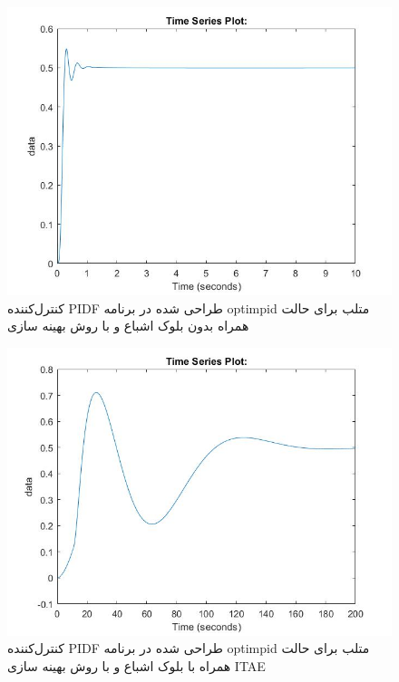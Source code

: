 \begin{figure}[H]
	\centering
	\includegraphics[width=12cm]{../Figure/P_IV/PID_IT2SE_without_sat.jpg}
	\caption{کنترل‌کننده PIDF طراحی شده در برنامه optimpid متلب برای حالت همراه بدون بلوک اشباع و با روش بهینه سازی }
\end{figure}



\begin{figure}[H]
	\centering
	\includegraphics[width=12cm]{../Figure/P_IV/PID_ITAE_with_sat.jpg}
	\caption{کنترل‌کننده PIDF طراحی شده در برنامه optimpid متلب برای حالت همراه با بلوک اشباع و با روش بهینه سازی ITAE}
\end{figure}
%


